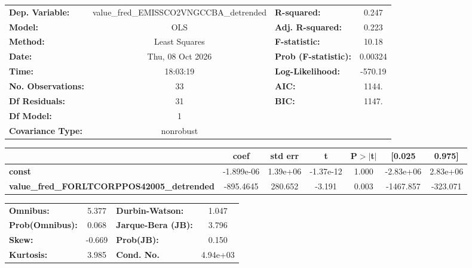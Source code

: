 \begin{center}
\begin{tabular}{lclc}
\toprule
\textbf{Dep. Variable:}                            & value\_fred\_EMISSCO2VNGCCBA\_detrended & \textbf{  R-squared:         } &     0.247   \\
\textbf{Model:}                                    &                   OLS                   & \textbf{  Adj. R-squared:    } &     0.223   \\
\textbf{Method:}                                   &              Least Squares              & \textbf{  F-statistic:       } &     10.18   \\
\textbf{Date:}                                     &             Thu, 08 Oct 2026            & \textbf{  Prob (F-statistic):} &  0.00324    \\
\textbf{Time:}                                     &                 18:03:19                & \textbf{  Log-Likelihood:    } &   -570.19   \\
\textbf{No. Observations:}                         &                      33                 & \textbf{  AIC:               } &     1144.   \\
\textbf{Df Residuals:}                             &                      31                 & \textbf{  BIC:               } &     1147.   \\
\textbf{Df Model:}                                 &                       1                 & \textbf{                     } &             \\
\textbf{Covariance Type:}                          &                nonrobust                & \textbf{                     } &             \\
\bottomrule
\end{tabular}
\begin{tabular}{lcccccc}
                                                   & \textbf{coef} & \textbf{std err} & \textbf{t} & \textbf{P$> |$t$|$} & \textbf{[0.025} & \textbf{0.975]}  \\
\midrule
\textbf{const}                                     &   -1.899e-06  &     1.39e+06     & -1.37e-12  &         1.000        &    -2.83e+06    &     2.83e+06     \\
\textbf{value\_fred\_FORLTCORPPOS42005\_detrended} &    -895.4645  &      280.652     &    -3.191  &         0.003        &    -1467.857    &     -323.071     \\
\bottomrule
\end{tabular}
\begin{tabular}{lclc}
\textbf{Omnibus:}       &  5.377 & \textbf{  Durbin-Watson:     } &    1.047  \\
\textbf{Prob(Omnibus):} &  0.068 & \textbf{  Jarque-Bera (JB):  } &    3.796  \\
\textbf{Skew:}          & -0.669 & \textbf{  Prob(JB):          } &    0.150  \\
\textbf{Kurtosis:}      &  3.985 & \textbf{  Cond. No.          } & 4.94e+03  \\
\bottomrule
\end{tabular}
\end{center}

